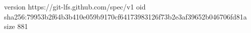 version https://git-lfs.github.com/spec/v1
oid sha256:79953b2f64b3b410e059b9170cf64173983126f73b2e3af39652b046706fd81a
size 881
